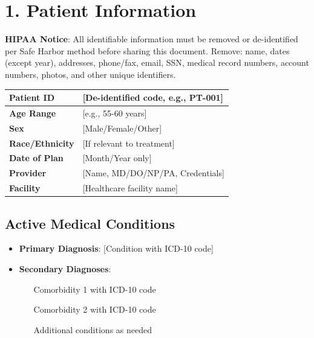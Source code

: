 \documentclass[11pt,letterpaper]{article}
\begin{document}
\section*{1. Patient Information}

\textbf{HIPAA Notice}: All identifiable information must be removed or de-identified per Safe Harbor method before sharing this document. Remove: name, dates (except year), addresses, phone/fax, email, SSN, medical record numbers, account numbers, photos, and other unique identifiers.

\vspace{0.5em}

\begin{tabularx}{\textwidth}{|l|X|}
\hline
\textbf{Patient ID} & [De-identified code, e.g., PT-001] \\ \hline
\textbf{Age Range} & [e.g., 55-60 years] \\ \hline
\textbf{Sex} & [Male/Female/Other] \\ \hline
\textbf{Race/Ethnicity} & [If relevant to treatment] \\ \hline
\textbf{Date of Plan} & [Month/Year only] \\ \hline
\textbf{Provider} & [Name, MD/DO/NP/PA, Credentials] \\ \hline
\textbf{Facility} & [Healthcare facility name] \\ \hline
\end{tabularx}

\vspace{1em}

\subsection*{Active Medical Conditions}
\begin{itemize}[leftmargin=*]
    \item \textbf{Primary Diagnosis}: [Condition with ICD-10 code]
    \item \textbf{Secondary Diagnoses}:
    \begin{itemize}
        \item [Comorbidity 1 with ICD-10 code]
        \item [Comorbidity 2 with ICD-10 code]
        \item [Additional conditions as needed]
    \end{itemize}
\end{itemize}
\end{document}
